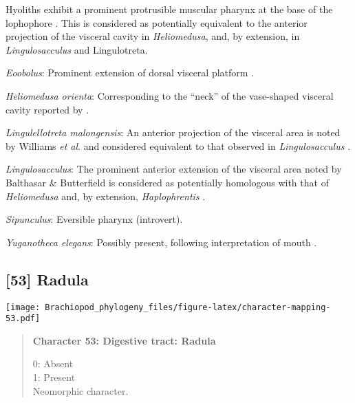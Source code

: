 \documentclass[openany]{book}
\theoremstyle{definition}
\theoremstyle{definition}
\theoremstyle{definition}
\theoremstyle{remark}
\begin{document}
Hyoliths exhibit a prominent protrusible muscular pharynx at the base of
the lophophore \citep{Moysiuk2017Hyolithsare}. This is considered as
potentially equivalent to the anterior projection of the visceral cavity
in \emph{Heliomedusa}, and, by extension, in \emph{Lingulosacculus} and
Lingulotreta.

\hypertarget{Eoobolus-coding-52}{}
\emph{Eoobolus}: Prominent extension of dorsal visceral platform
\citep{Balthasar2009Thebrachiopod}.

\hypertarget{Heliomedusa_orienta-coding-52}{}
\emph{Heliomedusa orienta}: Corresponding to the ``neck'' of the
vase-shaped visceral cavity reported by
\citet{Zhang2009Architectureand}.

\hypertarget{Lingulellotreta_malongensis-coding-52}{}
\emph{Lingulellotreta malongensis}: An anterior projection of the
visceral area is noted by Williams \emph{et al}.
\citeyearpar{Williams2000LinguliformeaCraniiformea} and considered
equivalent to that observed in \emph{Lingulosacculus}
\citep{Balthasar2009EarlyCambrian}.

\hypertarget{Lingulosacculus-coding-52}{}
\emph{Lingulosacculus}: The prominent anterior extension of the visceral
area noted by Balthasar \& Butterfield
\citeyearpar{Balthasar2009EarlyCambrian} is considered as potentially
homologous with that of \emph{Heliomedusa}
\citep{Zhang2009Architectureand} and, by extension, \emph{Haplophrentis}
\citep{Moysiuk2017Hyolithsare}.

\hypertarget{Sipunculus-coding-52}{}
\emph{Sipunculus}: Eversible pharynx (introvert).

\hypertarget{Yuganotheca_elegans-coding-52}{}
\emph{Yuganotheca elegans}: Possibly present, following interpretation
of mouth \citep[see fig. 2c, d in][]{Zhang2014Anearly}.

\subsection*{{[}53{]} Radula}\label{radula}

\texttt{[image: Brachiopod\_phylogeny\_files/figure-latex/character-mapping-53.pdf]}

\begin{quote}
\textbf{Character 53: Digestive tract: Radula}

0: Absent\\
1: Present\\
Neomorphic character.
\end{quote}
\end{document}
